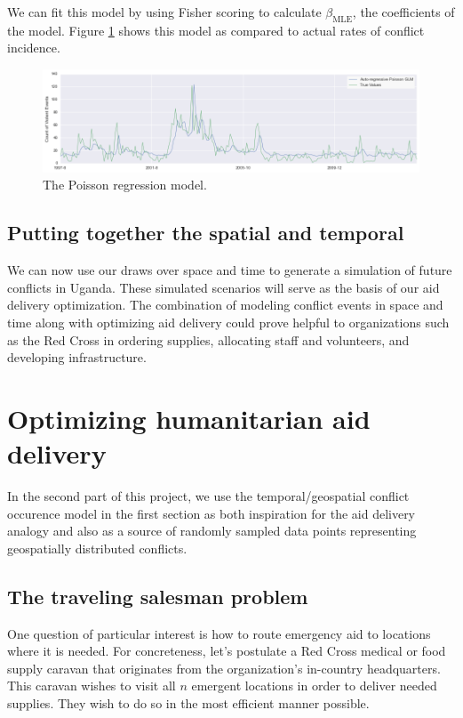 \documentclass{article} %
\begin{document}
We can fit this model by using Fisher scoring to calculate $\beta_\mathrm{MLE}$, the coefficients of the model. Figure \ref{fig:poisson} shows this model as compared to actual rates of conflict incidence.

\begin{figure}
\centering
\includegraphics[width=\textwidth]{figures/poisson-regression.png}
\caption{The Poisson regression model.}
\label{fig:poisson}
\end{figure}

\subsection{Putting together the spatial and temporal}

We can now use our draws over space and time to generate a simulation of future conflicts in Uganda. These simulated scenarios will serve as the basis of our aid delivery optimization. The combination of modeling conflict events in space and time along with optimizing aid delivery could prove helpful to organizations such as the Red Cross in ordering supplies, allocating staff and volunteers, and developing infrastructure.

\section{Optimizing humanitarian aid delivery}

In the second part of this project, we use the temporal/geospatial conflict occurence model in the first section as both inspiration for the aid delivery analogy and also as a source of randomly sampled data points representing geospatially distributed conflicts.

\subsection{The traveling salesman problem}

One question of particular interest is how to route emergency aid
to locations where it is needed.  For concreteness, let's postulate a Red Cross medical or food supply caravan that originates from the organization's in-country headquarters. This caravan wishes to visit all $n$ emergent locations in order to
deliver needed supplies. They wish to do so in the most efficient manner possible.
\end{document}
